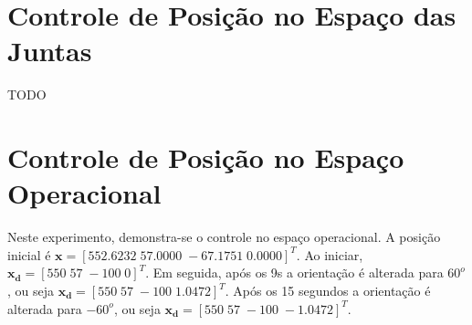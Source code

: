\section{Controle de Posição no Espaço das Juntas}
TODO 

\section{Controle de Posição no Espaço Operacional}
Neste experimento, demonstra-se o controle no espaço operacional.
A posição inicial é $\bm{x} =[ 552.6232 \; 57.0000 \; -67.1751 \; 0.0000]^T$. 
Ao iniciar, $\bm{x_d} =[ 550 \; 57 \; -100 \; 0]^T$. Em seguida, após os 9s a orientação é alterada para $60^o$, ou seja $\bm{x_d} =[ 550 \; 57 \; -100 \; 1.0472]^T$. Após os 15 segundos a orientação é alterada para $-60^o$, ou seja $\bm{x_d} =[ 550 \; 57 \; -100 \; -1.0472]^T$. 

